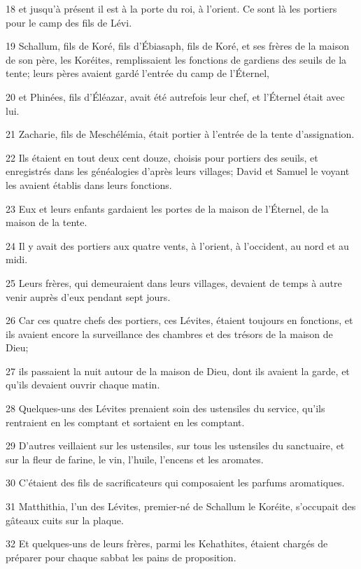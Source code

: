 \par 18 et jusqu'à présent il est à la porte du roi, à l'orient. Ce sont là les portiers pour le camp des fils de Lévi.
\par 19 Schallum, fils de Koré, fils d'Ébiasaph, fils de Koré, et ses frères de la maison de son père, les Koréites, remplissaient les fonctions de gardiens des seuils de la tente; leurs pères avaient gardé l'entrée du camp de l'Éternel,
\par 20 et Phinées, fils d'Éléazar, avait été autrefois leur chef, et l'Éternel était avec lui.
\par 21 Zacharie, fils de Meschélémia, était portier à l'entrée de la tente d'assignation.
\par 22 Ils étaient en tout deux cent douze, choisis pour portiers des seuils, et enregistrés dans les généalogies d'après leurs villages; David et Samuel le voyant les avaient établis dans leurs fonctions.
\par 23 Eux et leurs enfants gardaient les portes de la maison de l'Éternel, de la maison de la tente.
\par 24 Il y avait des portiers aux quatre vents, à l'orient, à l'occident, au nord et au midi.
\par 25 Leurs frères, qui demeuraient dans leurs villages, devaient de temps à autre venir auprès d'eux pendant sept jours.
\par 26 Car ces quatre chefs des portiers, ces Lévites, étaient toujours en fonctions, et ils avaient encore la surveillance des chambres et des trésors de la maison de Dieu;
\par 27 ils passaient la nuit autour de la maison de Dieu, dont ils avaient la garde, et qu'ils devaient ouvrir chaque matin.
\par 28 Quelques-uns des Lévites prenaient soin des ustensiles du service, qu'ils rentraient en les comptant et sortaient en les comptant.
\par 29 D'autres veillaient sur les ustensiles, sur tous les ustensiles du sanctuaire, et sur la fleur de farine, le vin, l'huile, l'encens et les aromates.
\par 30 C'étaient des fils de sacrificateurs qui composaient les parfums aromatiques.
\par 31 Matthithia, l'un des Lévites, premier-né de Schallum le Koréite, s'occupait des gâteaux cuits sur la plaque.
\par 32 Et quelques-uns de leurs frères, parmi les Kehathites, étaient chargés de préparer pour chaque sabbat les pains de proposition.
